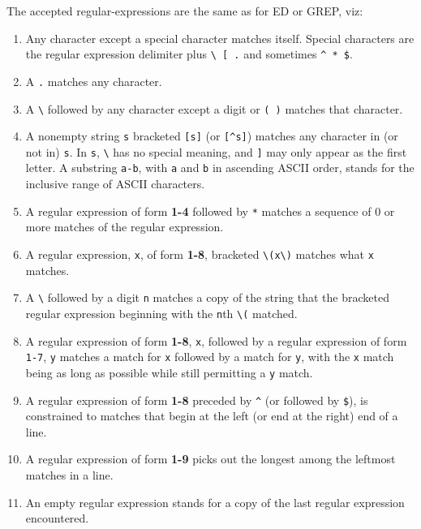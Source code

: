 The accepted regular-expressions are the same as for ED or GREP, viz:

\begin{enumerate}

\item  Any character except a special character matches itself.  Special
characters are the regular expression delimiter plus \verb|\ [ .| and
sometimes \verb|^ * $|.

\item  A \verb"." matches any character.

\item  A \verb|\| followed by any character except a digit or \verb|( )|
matches that character.

\item  A nonempty string \verb|s| bracketed \verb|[s]| (or \verb|[^s]|)
matches any character in (or not in) \verb|s|. In \verb|s|, \verb|\| has no
special meaning, and \verb|]| may only appear as the first letter. A
substring \verb|a-b|, with \verb|a| and \verb|b| in ascending ASCII order,
stands for the inclusive range of ASCII characters.

\item  A regular expression of form {\bf 1-4} followed by \verb|*| matches a
sequence of 0 or more matches of the regular expression.

\item  A regular expression, \verb"x", of form {\bf 1-8}, bracketed
\verb"\(x\)" matches what \verb"x" matches.

\item  A \verb"\" followed by a digit \verb|n| matches a copy of the string
that the bracketed regular expression beginning with the \verb|n|th
\verb|\(| matched.

\item  A regular expression of form {\bf 1-8}, \verb"x", followed by a
regular expression of form \verb"1-7", \verb"y" matches a match for \verb"x"
followed by a match for \verb"y", with the \verb"x" match being as long as
possible while still permitting a \verb"y" match.

\item  A regular expression of form {\bf 1-8} preceded by \verb"^" (or
followed by \verb"$"), is constrained to matches that begin at the left (or
end at the right) end of a line.

\item  A regular expression of form {\bf 1-9} picks out the longest among
the leftmost matches in a line.

\item  An empty regular expression stands for a copy of the last regular
expression encountered.

\end{enumerate}

